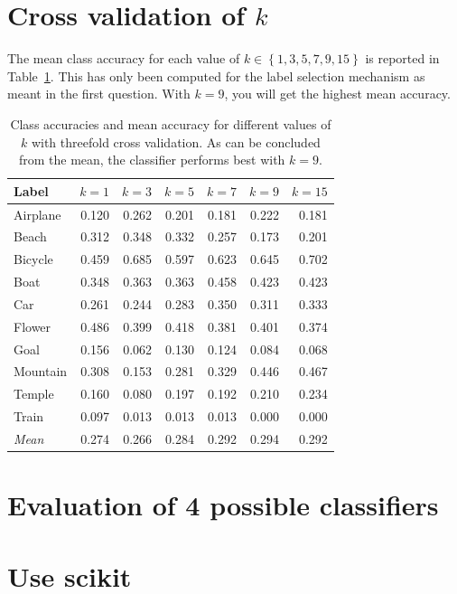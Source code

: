 \documentclass[a4paper,10pt,twoside]{article}
\begin{document}
\section{Cross validation of $k$}
The mean class accuracy for each value of $k \in \left\{1, 3, 5, 7, 9, 15\right\}$ is reported in Table~\ref{t:crossacc}.  This has only been computed for the label selection mechanism as meant in the first question.  With $k=9$, you will get the highest mean accuracy.

\begin{table}
  \centering
  \begin{tabular}{l|rrrrrr}
    Label &  $k=1$ &  $k=3$ &  $k=5$ &  $k=7$ &  $k=9$ &  $k=15$ \\
    \hline
    Airplane  & 0.120  & 0.262  & 0.201  & 0.181  & 0.222  & 0.181 \\
       Beach  & 0.312  & 0.348  & 0.332  & 0.257  & 0.173  & 0.201 \\
     Bicycle  & 0.459  & 0.685  & 0.597  & 0.623  & 0.645  & 0.702 \\
        Boat  & 0.348  & 0.363  & 0.363  & 0.458  & 0.423  & 0.423 \\
         Car  & 0.261  & 0.244  & 0.283  & 0.350  & 0.311  & 0.333 \\
      Flower  & 0.486  & 0.399  & 0.418  & 0.381  & 0.401  & 0.374 \\
        Goal  & 0.156  & 0.062  & 0.130  & 0.124  & 0.084  & 0.068 \\
    Mountain  & 0.308  & 0.153  & 0.281  & 0.329  & 0.446  & 0.467 \\
      Temple  & 0.160  & 0.080  & 0.197  & 0.192  & 0.210  & 0.234 \\
       Train  & 0.097  & 0.013  & 0.013  & 0.013  & 0.000  & 0.000 \\
    \hline
  \emph{Mean} & 0.274  & 0.266  & 0.284  & 0.292  & 0.294  & 0.292 \\
  \end{tabular}
  \caption{Class accuracies and mean accuracy for different values of $k$ with threefold cross validation.  As can be concluded from the mean, the classifier performs best with $k=9$.}
  \label{t:crossacc}
\end{table}

\section{Evaluation of 4 possible classifiers}

\section{Use scikit}
\end{document}
